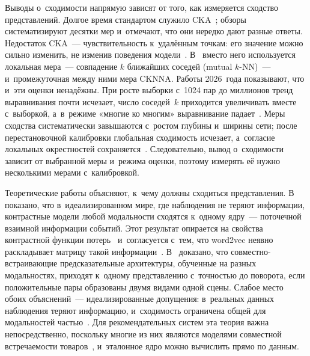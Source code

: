 \documentclass[a4paper,12pt]{article}
\begin{document}
Выводы о~сходимости напрямую зависят от того, как измеряется сходство представлений.
Долгое время стандартом служило CKA~\cite{kornblith2019cka}; обзоры~\cite{klabunde2025survey,sucholutsky2023aligned}
систематизируют десятки мер и~отмечают, что они нередко дают разные ответы. Недостаток
CKA~--- чувствительность к~удалённым точкам: его значение можно сильно изменить,
не изменив поведения модели~\cite{davari2023cka}. В~\cite{huh2024platonic} вместо него
используется локальная мера~--- совпадение $k$ ближайших соседей (mutual $k$-NN)~---
и~промежуточная между ними мера CKNNA. Работы 2026~года показывают, что и~эти оценки
ненадёжны. При росте выборки с~1024 пар до миллионов тренд выравнивания почти исчезает,
число соседей~$k$ приходится увеличивать вместе с~выборкой, а~в~режиме «многие ко многим»
выравнивание падает~\cite{koepke2026cave}. Меры сходства систематически завышаются
с~ростом глубины и~ширины сети; после перестановочной калибровки глобальная сходимость
исчезает, а~согласие локальных окрестностей сохраняется~\cite{groger2026aristotelian}.
Следовательно, вывод о~сходимости зависит от выбранной меры и~режима оценки, поэтому
измерять её нужно несколькими мерами с~калибровкой.

Теоретические работы объясняют, к~чему должны сходиться представления.
В~\cite{huh2024platonic} показано, что в~идеализированном мире, где наблюдения
не теряют информации, контрастные модели любой модальности сходятся к~одному ядру~---
поточечной взаимной информации событий. Этот результат опирается на свойства
контрастной функции потерь~\cite{oord2018cpc} и~согласуется с~тем, что word2vec неявно
раскладывает матрицу такой информации~\cite{levy2014implicit}. В~\cite{balestriero2026jepa}
доказано, что совместно-встраивающие предсказательные архитектуры, обученные на разных
модальностях, приходят к~одному представлению с~точностью до поворота, если положительные
пары образованы двумя видами одной сцены. Слабое место обоих объяснений~---
идеализированные допущения: в~реальных данных наблюдения теряют информацию, и~сходимость
ограничена общей для модальностей частью~\cite{huh2024platonic}. Для рекомендательных
систем эта теория важна непосредственно, поскольку многие из них являются моделями
совместной встречаемости товаров~\cite{barkan2016item2vec}, и~эталонное ядро можно
вычислить прямо по данным.
\end{document}
